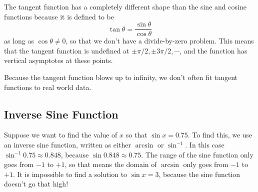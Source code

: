 The tangent function has a completely different shape than the sine and cosine functions because it is defined to be
\[ \tan \theta = \frac{\sin \theta}{\cos \theta} \]
as long as $\cos \theta \neq 0$, so that we don't have a divide-by-zero problem.  This
means that the tangent function is undefined at $\pm \pi/2, \pm 3 \pi/2, \cdots$, and the
function has vertical asymptotes at these points.
\begin{center}
\end{center}
Because the tangent function blows up to infinity, we don't often fit tangent functions to real world data.

\subsection*{Inverse Sine Function}

Suppose we want to find the value of $x$ so that $\sin x = 0.75$.  To find this, we use an
inverse sine function, written as either $\arcsin$ or $\sin^{-1}$.  In this case
$\sin^{-1} 0.75 \approx 0.848$, because $\sin 0.848 \approx 0.75$.  The range of the sine
function only goes from $-1$ to $+1$, so that means the domain of $\arcsin$ only goes from
$-1$ to $+1$.  It is impossible to find a solution to $\sin x = 3$, because the sine
function doesn't go that high!

